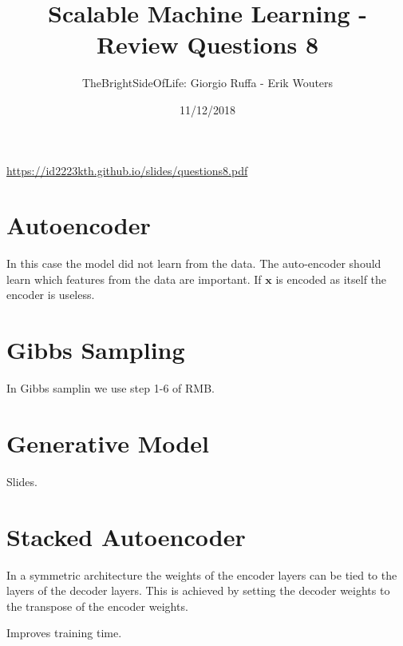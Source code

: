 \documentclass[a4paper]{article}
\title{Scalable Machine Learning - Review Questions 8}
\author{TheBrightSideOfLife: Giorgio Ruffa - Erik Wouters}
\date{11/12/2018}
\begin{document}
\maketitle

\url{https://id2223kth.github.io/slides/questions8.pdf}

\section{Autoencoder}
In this case the model did not learn from the data. The auto-encoder should learn which features from the data are important. If $\mathbf{x}$ is encoded as itself the encoder is useless.

\section{Gibbs Sampling}
In Gibbs samplin we use step 1-6 of RMB.

\section{Generative Model}
Slides.

\section{Stacked Autoencoder}
In a symmetric architecture the weights of the encoder layers can be tied to the layers of the decoder layers. This is achieved by setting the decoder weights to the transpose of the encoder weights.

Improves training time.


% 
\end{document}
